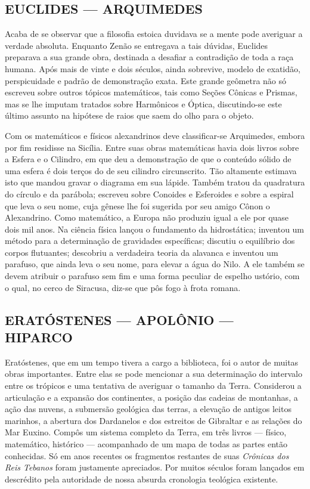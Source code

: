 \documentclass[11pt,a5paper,twoside,openany]{book}
\begin{document}
\subsection*{EUCLIDES — ARQUIMEDES}
Acaba de se observar que a filosofia estoica duvidava se a mente pode averiguar a verdade absoluta. Enquanto Zenão se entregava a tais dúvidas, Euclides preparava a sua grande obra, destinada a desafiar a contradição de toda a raça humana. Após mais de vinte e dois séculos, ainda sobrevive, modelo de exatidão, perspicuidade e padrão de demonstração exata. Este grande geômetra não só escreveu sobre outros tópicos matemáticos, tais como Seções Cônicas e Prismas, mas se lhe imputam tratados sobre Harmônicos e Óptica, discutindo-se este último assunto na hipótese de raios que saem do olho para o objeto.

Com os matemáticos e físicos alexandrinos deve classificar-se Arquimedes, embora por fim residisse na Sicília. Entre suas obras matemáticas havia dois livros sobre a Esfera e o Cilindro, em que deu a demonstração de que o conteúdo sólido de uma esfera é dois terços do de seu cilindro circunscrito. Tão altamente estimava isto que mandou gravar o diagrama em sua lápide. Também tratou da quadratura do círculo e da parábola; escreveu sobre Conoides e Esferoides e sobre a espiral que leva o seu nome, cuja gênese lhe foi sugerida por seu amigo Cônon o Alexandrino. Como matemático, a Europa não produziu igual a ele por quase dois mil anos. Na ciência física lançou o fundamento da hidrostática; inventou um método para a determinação de gravidades específicas; discutiu o equilíbrio dos corpos flutuantes; descobriu a verdadeira teoria da alavanca e inventou um parafuso, que ainda leva o seu nome, para elevar a água do Nilo. A ele também se devem atribuir o parafuso sem fim e uma forma peculiar de espelho ustório, com o qual, no cerco de Siracusa, diz-se que pôs fogo à frota romana.

\subsection*{ERATÓSTENES — APOLÔNIO — HIPARCO}
Eratóstenes, que em um tempo tivera a cargo a biblioteca, foi o autor de muitas obras importantes. Entre elas se pode mencionar a sua determinação do intervalo entre os trópicos e uma tentativa de averiguar o tamanho da Terra. Considerou a articulação e a expansão dos continentes, a posição das cadeias de montanhas, a ação das nuvens, a submersão geológica das terras, a elevação de antigos leitos marinhos, a abertura dos Dardanelos e dos estreitos de Gibraltar e as relações do Mar Euxino. Compôs um sistema completo da Terra, em três livros — físico, matemático, histórico — acompanhado de um mapa de todas as partes então conhecidas. Só em anos recentes os fragmentos restantes de suas \textit{Crônicas dos Reis Tebanos} foram justamente apreciados. Por muitos séculos foram lançados em descrédito pela autoridade de nossa absurda cronologia teológica existente.
\end{document}
